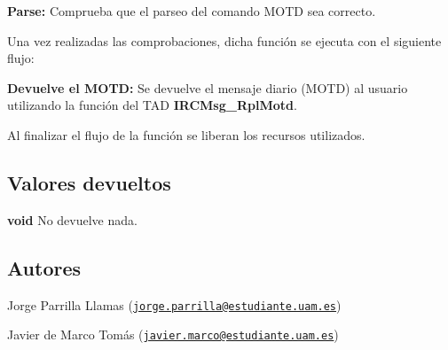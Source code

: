 \begin{DoxyItemize}
\item {\bfseries Parse\+:} Comprueba que el parseo del comando M\+O\+T\+D sea correcto. 
\end{DoxyItemize}

Una vez realizadas las comprobaciones, dicha función se ejecuta con el siguiente flujo\+:


\begin{DoxyItemize}
\item {\bfseries Devuelve el M\+O\+T\+D\+:} Se devuelve el mensaje diario (M\+O\+T\+D) al usuario utilizando la función del T\+A\+D {\bfseries I\+R\+C\+Msg\+\_\+\+Rpl\+Motd}.  
\end{DoxyItemize}

Al finalizar el flujo de la función se liberan los recursos utilizados.\hypertarget{server_command_motd_return_motd}{}\subsection{Valores devueltos}\label{server_command_motd_return_motd}

\begin{DoxyItemize}
\item {\bfseries void} No devuelve nada. 
\end{DoxyItemize}\hypertarget{server_command_motd_authors_motd}{}\subsection{Autores}\label{server_command_motd_authors_motd}

\begin{DoxyItemize}
\item Jorge Parrilla Llamas (\href{mailto:jorge.parrilla@estudiante.uam.es}{\tt jorge.\+parrilla@estudiante.\+uam.\+es}) 
\item Javier de Marco Tomás (\href{mailto:javier.marco@estudiante.uam.es}{\tt javier.\+marco@estudiante.\+uam.\+es}) 
\end{DoxyItemize}